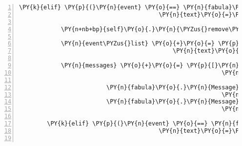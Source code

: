 \begin{Verbatim}[commandchars=\\\{\},numbers=left,firstnumber=1,stepnumber=1]
        \PY{k}{elif} \PY{p}{(}\PY{n}{event} \PY{o}{==} \PY{n}{fabula}\PY{o}{.}\PY{n}{SaysEvent}\PY{p}{(}\PY{n}{identifier}\PY{o}{=}\PY{n}{ID\PYZus{}CASSANDRA}\PY{p}{,}
                                        \PY{n}{text}\PY{o}{=}\PY{l+s}{\PYZsq{}}\PY{l+s}{Die Brücke, die über den Fluss in Richtung Zauberwald führt, ist kaputt.}\PY{l+s}{\PYZsq{}}\PY{p}{)}\PY{p}{)}\PY{p}{:}

            \PY{n+nb+bp}{self}\PY{o}{.}\PY{n}{\PYZus{}remove\PYZus{}sentence}\PY{p}{(}\PY{n}{ID\PYZus{}CASSANDRA}\PY{p}{,} \PY{n}{event}\PY{o}{.}\PY{n}{text}\PY{p}{)}

            \PY{n}{event\PYZus{}list} \PY{o}{+}\PY{o}{=} \PY{p}{[}\PY{n}{fabula}\PY{o}{.}\PY{n}{SaysEvent}\PY{p}{(}\PY{n}{identifier}\PY{o}{=}\PY{n}{ID\PYZus{}KUNI}\PY{p}{,}
                                            \PY{n}{text}\PY{o}{=}\PY{l+s}{\PYZsq{}}\PY{l+s}{Hm \PYZhy{} kannst du nicht über den Fluss fliegen? Du bist doch eine Fee.}\PY{l+s}{\PYZsq{}}\PY{p}{)}\PY{p}{]}

            \PY{n}{messages} \PY{o}{+}\PY{o}{=} \PY{p}{[}\PY{n}{fabula}\PY{o}{.}\PY{n}{Message}\PY{p}{(}\PY{p}{[}\PY{n}{fabula}\PY{o}{.}\PY{n}{SaysEvent}\PY{p}{(}\PY{n}{identifier}\PY{o}{=}\PY{n}{ID\PYZus{}CASSANDRA}\PY{p}{,}
                                                          \PY{n}{text}\PY{o}{=}\PY{l+s}{\PYZsq{}}\PY{l+s}{Mein Flügel muss geklebt werden }\PY{l+s}{\PYZsq{}}
                                                               \PY{l+s}{\PYZsq{}}\PY{l+s}{dann könnte ich wieder fliegen.}\PY{l+s}{\PYZsq{}}\PY{p}{)}\PY{p}{]}\PY{p}{)}\PY{p}{,}
                         \PY{n}{fabula}\PY{o}{.}\PY{n}{Message}\PY{p}{(}\PY{p}{[}\PY{n}{fabula}\PY{o}{.}\PY{n}{SaysEvent}\PY{p}{(}\PY{n}{identifier}\PY{o}{=}\PY{n}{ID\PYZus{}KUNI}\PY{p}{,}
                                                          \PY{n}{text}\PY{o}{=}\PY{l+s}{\PYZsq{}}\PY{l+s}{Hm \PYZhy{} könntest du mich mitnehmen?}\PY{l+s}{\PYZsq{}}\PY{p}{)}\PY{p}{]}\PY{p}{)}\PY{p}{,}
                         \PY{n}{fabula}\PY{o}{.}\PY{n}{Message}\PY{p}{(}\PY{p}{[}\PY{n}{fabula}\PY{o}{.}\PY{n}{SaysEvent}\PY{p}{(}\PY{n}{identifier}\PY{o}{=}\PY{n}{ID\PYZus{}CASSANDRA}\PY{p}{,}
                                                          \PY{n}{text}\PY{o}{=}\PY{l+s}{\PYZsq{}}\PY{l+s}{Leider können meine Flügel kaum mein eigenes Gewicht tragen.}\PY{l+s}{\PYZsq{}}\PY{p}{)}\PY{p}{]}\PY{p}{)}\PY{p}{]}

        \PY{k}{elif} \PY{p}{(}\PY{n}{event} \PY{o}{==} \PY{n}{fabula}\PY{o}{.}\PY{n}{SaysEvent}\PY{p}{(}\PY{n}{identifier}\PY{o}{=}\PY{n}{ID\PYZus{}KUNI}\PY{p}{,}
                                        \PY{n}{text}\PY{o}{=}\PY{l+s}{\PYZsq{}}\PY{l+s}{Die Tür zum Gnomenweg ist offen! Da gehts zum Zauberwald lang!}\PY{l+s}{\PYZsq{}}\PY{p}{)}\PY{p}{)}\PY{p}{:}


\end{Verbatim}
